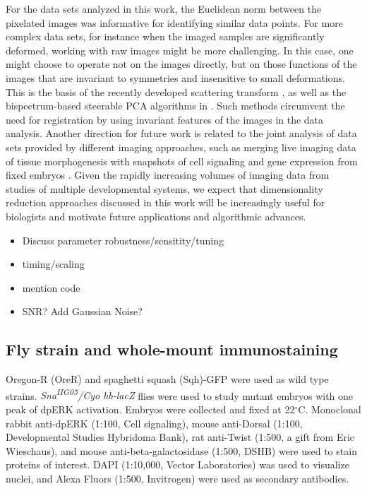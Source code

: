\documentclass{pnastwo}
\begin{document}
\begin{article}
For the data sets analyzed in this work, the Euclidean norm between the pixelated images was informative for identifying similar data points. 
%
For more complex data sets, for instance when the imaged samples are significantly deformed, working with raw images might be more challenging.   
%
In this case, one might choose to operate not on the images directly, but on those functions of the images that are invariant to symmetries and insensitive to small deformations.  
%
This is the basis of the recently developed scattering transform \cite{mallat2012group}, as well as the bispectrum-based steerable PCA algorithms in \cite{zhao2014rotationally}. 
%
Such methods circumvent the need for registration by using invariant features of the images in the data analysis.
%
Another direction for future work is related to the joint analysis of data sets provided by different imaging approaches, such as merging live imaging data of tissue morphogenesis with snapshots of cell signaling and gene expression from fixed embryos \cite{krzic2012multiview, ichikawa2014live, rubel2010coupling}. 
%
Given the rapidly increasing volumes of imaging data from studies of multiple developmental systems, we expect that dimensionality reduction approaches discussed in this work will be increasingly useful for biologists and motivate future applications and algorithmic advances. 
  
  
  \begin{itemize}
  \item Discuss parameter robustness/sensitity/tuning
  \item timing/scaling
  \item mention code
  \item SNR? Add Gaussian Noise?
  \end{itemize}





\begin{materials}

\section{Fly strain and whole-mount immunostaining}
%
Oregon-R (OreR) and spaghetti squash (Sqh)-GFP were used as wild type strains. 
%
{\it Sna\textsuperscript{\it IIG05}/Cyo hb-lacZ} flies were used to study mutant embryos with one peak of dpERK activation.  
%
Embryos were collected and fixed at 22$^\circ$C. 
%
Monoclonal rabbit anti-dpERK (1:100, Cell signaling), mouse anti-Dorsal (1:100, Developmental Studies Hybridoma Bank), rat anti-Twist (1:500, a gift from Eric Wieschaus), and mouse anti-beta-galactosidase (1:500, DSHB) were used to stain proteins of interest. DAPI (1:10,000, Vector Laboratories) was used to visualize nuclei, and Alexa Fluors (1:500, Invitrogen) were used as secondary antibodies. 


\end{materials}
\end{article}
\end{document}
